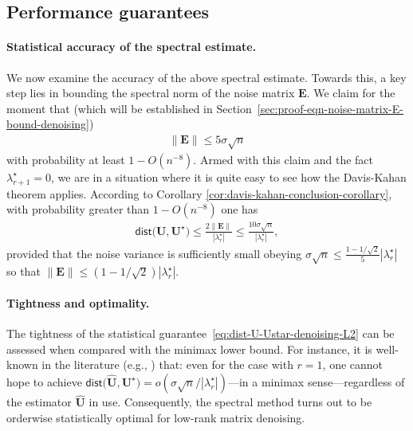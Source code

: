 \subsection{Performance guarantees}
\label{sec:performance-denoising-L2}

\paragraph{Statistical accuracy of the spectral estimate.}

We now examine the accuracy of the above spectral estimate. Towards this,
a key step lies in bounding the spectral norm of the noise matrix
$\bm{E}$. We claim for the moment that (which will be established in Section~\ref{sec:proof-eqn-noise-matrix-E-bound-denoising})
%
\begin{align}
	\|\bm{E}\| \leq 5\sigma\sqrt{n}
	\label{eq:noise-matrix-E-bound-denoising}
\end{align}
%
with probability at least $1-O(n^{-8})$.
Armed with this claim and the fact $\lambda_{r+1}^{\star}=0$,
we are in a situation where it is quite easy to see how the Davis-Kahan theorem applies.
According to Corollary \ref{cor:davis-kahan-conclusion-corollary}, with probability greater than $1-O(n^{-8})$ one has
%
\begin{align}
	\mathsf{dist}\big(\bm{U},\bm{U}^{\star}\big)\leq\frac{2\|\bm{E}\|}{|\lambda_{r}^{\star}|}\leq\frac{10\sigma\sqrt{n}}{|\lambda_{r}^{\star}|} ,
	\label{eq:dist-U-Ustar-denoising-L2}
\end{align}
%
provided that the noise variance is sufficiently small obeying $ \sigma \sqrt{n} \leq \frac{1-1/\sqrt{2}}{5} |\lambda_r^{\star}|$ so that $\|\bm{E}\|\leq (1-1/\sqrt{2})|\lambda_r^{\star}|$.




\paragraph{Tightness and optimality.}
%
The tightness of the statistical guarantee~\eqref{eq:dist-U-Ustar-denoising-L2} can be assessed when compared with the minimax lower bound. For instance, it is well-known in the literature (e.g., \citet[Theorem 3]{cheng2020tackling}) that: even for the case with $r=1$, one cannot hope to achieve $\mathsf{dist}\big(\widehat{\bm{U}},\bm{U}^{\star}\big)=o(\sigma \sqrt{n}/|\lambda_{r}^{\star}| )$---in a minimax sense---regardless of the estimator $\widehat{\bm{U}}$ in use. 
Consequently, the spectral method turns out to be orderwise statistically optimal for low-rank matrix denoising.




